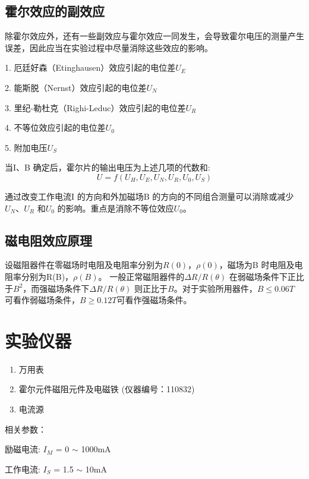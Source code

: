 \documentclass[UTF8]{ctexart}
\begin{document}
    \subsection {霍尔效应的副效应} 

    除霍尔效应外，还有一些副效应与霍尔效应一同发生，会导致霍尔电压的测量产生误差，因此应当在实验过程中尽量消除这些效应的影响。

   1. 厄廷好森（Etinghausen）效应引起的电位差$U_E$
  
   2. 能斯脱（Nernst）效应引起的电位差$U_N$

   3. 里纪-勒杜克（Righi-Leduc）效应引起的电位差$U_R$
   
   4. 不等位效应引起的电位差$U_0$

   5. 附加电压$U_S$

    当I、B 确定后，霍尔片的输出电压为上述几项的代数和:
    $$
    U = f(U_H, U_E, U_N, U_R, U_0, U_S)
    $$

    通过改变工作电流I 的方向和外加磁场B 的方向的不同组合测量可以消除或减少$U_N$、$U_R$ 和$U_0$ 的影响。重点是消除不等位效应$U_0$。
   





    \subsection {磁电阻效应原理} 

    设磁阻器件在零磁场时电阻及电阻率分别为$R(0)$，$\rho(0)$，磁场为B 时电阻及电阻率分别为R(B)，$\rho(B)$。
    一般正常磁阻器件的$\Delta R/R(\theta)$ 在弱磁场条件下正比于$B^2$，而强磁场条件下$\Delta R/R(\theta)$ 则正比于$B$。对于实验所用器件，$B \leq 0.06T$ 可看作弱磁场条件，$B \geq 0.12T $可看作强磁场条件。
 


\section{实验仪器}
\begin{enumerate}
  \item 万用表
  \item 霍尔元件磁阻元件及电磁铁 (仪器编号：110832)
  \item 电流源
\end{enumerate}

\noindent 相关参数：

     励磁电流: $I_M$ = 0 $\sim$ 1000mA
     
     工作电流: $I_S$ = 1.5 $\sim$ 10mA
\end{document}
